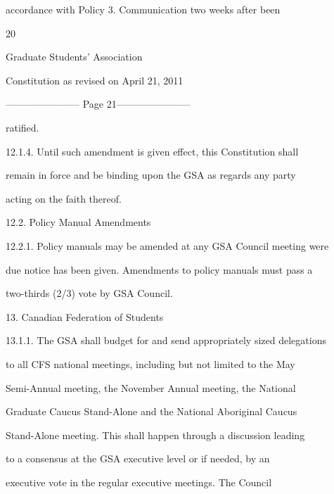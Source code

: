         accordance  with  Policy  3.  Communication  two  weeks  after  been  

                                                

                                             20  



                               Graduate Students’ Association  



                          Constitution as revised on April 21, 2011  


----------------------- Page 21-----------------------

        ratified.  



12.1.4.     Until  such  amendment  is  given  effect,  this  Constitution  shall  

        remain  in  force  and  be  binding  upon  the  GSA  as  regards  any  party  

        acting on the faith thereof.  



12.2.       Policy Manual Amendments  



12.2.1.     Policy manuals may be amended at any GSA Council meeting were  

        due notice has been given. Amendments to policy manuals must pass a  

        two-thirds (2/3) vote by GSA Council.  



13.  Canadian Federation of Students  



13.1.1.     The GSA shall budget for and send appropriately sized delegations  

        to  all  CFS  national  meetings,  including  but  not  limited  to  the  May  

        Semi-Annual  meeting,  the  November  Annual  meeting,  the  National  

        Graduate  Caucus  Stand-Alone  and  the  National  Aboriginal  Caucus  

        Stand-Alone meeting. This shall happen through a discussion leading  

        to  a  consensus  at  the  GSA  executive  level  or  if  needed,  by  an  

        executive   vote   in   the   regular   executive   meetings.   The   Council  

